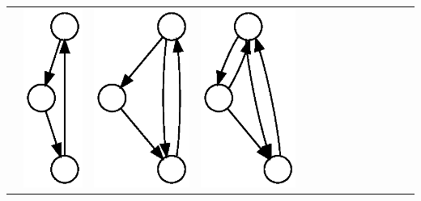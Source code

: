 \begin{table}[t!]
  \centering
  \begin{tabular}{l|lllllllllllll}
    \hline\noalign{\smallskip}
    &
    \includegraphics[height=0.03\textheight]{M1-plain} &
    \includegraphics[height=0.03\textheight]{M2-plain} &
    \includegraphics[height=0.03\textheight]{M3-plain} &

\end{tabular}
\end{table}
